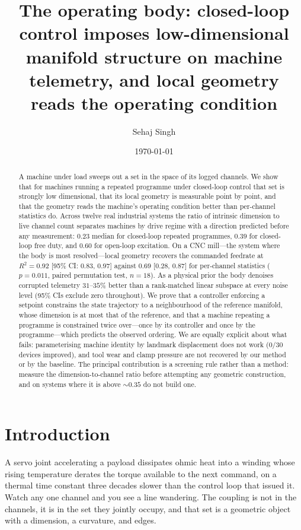 \documentclass[11pt]{article}
\title{\bf The operating body: closed-loop control imposes
low-dimensional manifold structure on machine telemetry,
and local geometry reads the operating condition}
\author{Sehaj Singh}
\date{\today}
\begin{document}
\maketitle

\begin{abstract}
\noindent
A machine under load sweeps out a set in the space of its logged channels.
We show that for machines running a repeated programme under closed-loop
control that set is strongly low dimensional, that its local geometry is
measurable point by point, and that the geometry reads the machine's operating
condition better than per-channel statistics do. Across twelve real industrial
systems the ratio of intrinsic dimension to live channel count separates
machines by drive regime with a direction predicted before any measurement:
$0.23$ median for closed-loop repeated programmes, $0.39$ for closed-loop free
duty, and $0.60$ for open-loop excitation. On a CNC mill---the system where the
body is most resolved---local geometry recovers the commanded feedrate at
$R^2 = 0.92$ [95\% CI: $0.83$, $0.97$] against $0.69$ [$0.28$, $0.87$] for
per-channel statistics ($p = 0.011$, paired permutation test, $n = 18$). As a
physical prior the body denoises corrupted telemetry $31$--$35\%$ better than a
rank-matched linear subspace at every noise level (95\% CIs exclude zero
throughout). We prove that a controller enforcing a setpoint constrains the state
trajectory to a neighbourhood of the reference manifold, whose dimension is
at most that of the reference, and that a machine repeating a programme is
constrained twice over---once by its controller and once by the
programme---which predicts the observed ordering. We are equally explicit about what fails: parameterising machine
identity by landmark displacement does not work ($0/30$ devices improved), and
tool wear and clamp pressure are not recovered by our method or by the
baseline. The principal contribution is a screening rule rather than a method:
measure the dimension-to-channel ratio before attempting any geometric
construction, and on systems where it is above $\sim 0.35$ do not build one.
\end{abstract}

\section{Introduction}

A servo joint accelerating a payload dissipates ohmic heat into a winding whose
rising temperature derates the torque available to the next command, on a
thermal time constant three decades slower than the control loop that issued
it. Watch any one channel and you see a line wandering. The coupling is not in
the channels, it is in the set they jointly occupy, and that set is a geometric
object with a dimension, a curvature, and edges.
\end{document}

